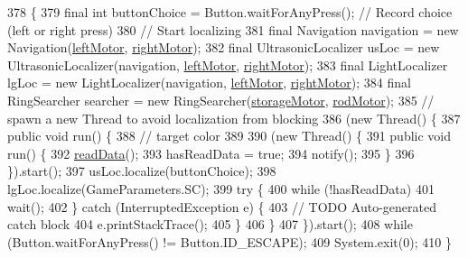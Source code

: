 \begin{DoxyCode}
378                                                                \{
379     \textcolor{keyword}{final} \textcolor{keywordtype}{int} buttonChoice = Button.waitForAnyPress(); \textcolor{comment}{// Record choice (left or right press)}
380     \textcolor{comment}{// Start localizing}
381     \textcolor{keyword}{final} Navigation navigation = \textcolor{keyword}{new} Navigation(\hyperlink{enumca_1_1mcgill_1_1ecse211_1_1project_1_1_game_a7c673571bf50fdb6917a9d7bb671e003}{leftMotor}, \hyperlink{enumca_1_1mcgill_1_1ecse211_1_1project_1_1_game_a7a05fcf37c4435c32270776a427ba0d2}{rightMotor});
382     \textcolor{keyword}{final} UltrasonicLocalizer usLoc = \textcolor{keyword}{new} UltrasonicLocalizer(navigation, 
      \hyperlink{enumca_1_1mcgill_1_1ecse211_1_1project_1_1_game_a7c673571bf50fdb6917a9d7bb671e003}{leftMotor}, \hyperlink{enumca_1_1mcgill_1_1ecse211_1_1project_1_1_game_a7a05fcf37c4435c32270776a427ba0d2}{rightMotor});
383     \textcolor{keyword}{final} LightLocalizer lgLoc = \textcolor{keyword}{new} LightLocalizer(navigation, \hyperlink{enumca_1_1mcgill_1_1ecse211_1_1project_1_1_game_a7c673571bf50fdb6917a9d7bb671e003}{leftMotor}, 
      \hyperlink{enumca_1_1mcgill_1_1ecse211_1_1project_1_1_game_a7a05fcf37c4435c32270776a427ba0d2}{rightMotor});
384     \textcolor{keyword}{final} RingSearcher searcher = \textcolor{keyword}{new} RingSearcher(\hyperlink{enumca_1_1mcgill_1_1ecse211_1_1project_1_1_game_af3ba5407b115e9c6e07dffda576f29b7}{storageMotor}, 
      \hyperlink{enumca_1_1mcgill_1_1ecse211_1_1project_1_1_game_aeb41e5234fcb3b311385f39a07a24a54}{rodMotor});
385     \textcolor{comment}{// spawn a new Thread to avoid localization from blocking}
386     (\textcolor{keyword}{new} Thread() \{
387       \textcolor{keyword}{public} \textcolor{keywordtype}{void} run() \{
388         \textcolor{comment}{// target color}
389 
390         (\textcolor{keyword}{new} Thread() \{
391           \textcolor{keyword}{public} \textcolor{keywordtype}{void} run() \{
392             \hyperlink{enumca_1_1mcgill_1_1ecse211_1_1project_1_1_game_ab28110fca0af679acdaea84025746f15}{readData}();
393             hasReadData = \textcolor{keyword}{true};
394             notify();
395           \}
396         \}).start();
397         usLoc.localize(buttonChoice);
398         lgLoc.localize(GameParameters.SC);
399         \textcolor{keywordflow}{try} \{
400           \textcolor{keywordflow}{while} (!hasReadData)
401             wait();
402         \} \textcolor{keywordflow}{catch} (InterruptedException e) \{
403           \textcolor{comment}{// TODO Auto-generated catch block}
404           e.printStackTrace();
405         \}
406       \}
407     \}).start();
408     \textcolor{keywordflow}{while} (Button.waitForAnyPress() != Button.ID\_ESCAPE);
409     System.exit(0);
410   \}
\end{DoxyCode}
